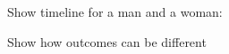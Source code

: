 \documentclass[compress, 8pt]{beamer}
\begin{document}
{

}



\begin{frame}{}

Show timeline for a man and a woman:

Show how outcomes can be different


\end{frame}









%
%








\end{document}
